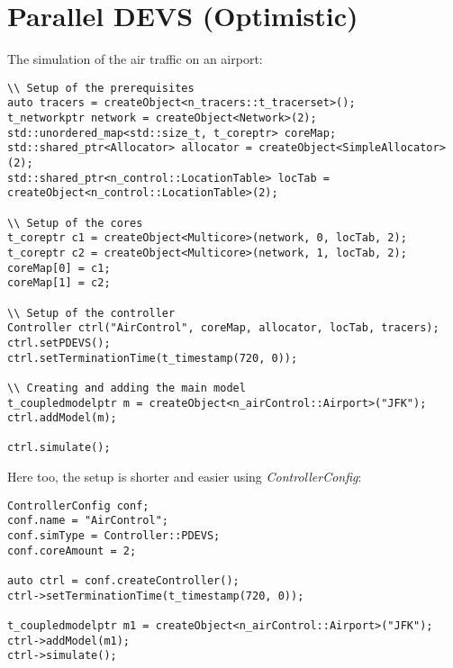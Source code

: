 \section{Parallel DEVS (Optimistic)}
The simulation of the air traffic on an airport:
\begin{Verbatim}[fontsize=\small]
\\ Setup of the prerequisites
auto tracers = createObject<n_tracers::t_tracerset>();
t_networkptr network = createObject<Network>(2);
std::unordered_map<std::size_t, t_coreptr> coreMap;
std::shared_ptr<Allocator> allocator = createObject<SimpleAllocator>(2);
std::shared_ptr<n_control::LocationTable> locTab = createObject<n_control::LocationTable>(2);

\\ Setup of the cores
t_coreptr c1 = createObject<Multicore>(network, 0, locTab, 2);
t_coreptr c2 = createObject<Multicore>(network, 1, locTab, 2);
coreMap[0] = c1;
coreMap[1] = c2;

\\ Setup of the controller
Controller ctrl("AirControl", coreMap, allocator, locTab, tracers);
ctrl.setPDEVS();
ctrl.setTerminationTime(t_timestamp(720, 0));

\\ Creating and adding the main model
t_coupledmodelptr m = createObject<n_airControl::Airport>("JFK");
ctrl.addModel(m);

ctrl.simulate();
\end{Verbatim}

Here too, the setup is shorter and easier using \textsl{ControllerConfig}:

\begin{Verbatim}[fontsize=\small]
ControllerConfig conf;
conf.name = "AirControl";
conf.simType = Controller::PDEVS;
conf.coreAmount = 2;

auto ctrl = conf.createController();
ctrl->setTerminationTime(t_timestamp(720, 0));

t_coupledmodelptr m1 = createObject<n_airControl::Airport>("JFK");
ctrl->addModel(m1);
ctrl->simulate();
\end{Verbatim}